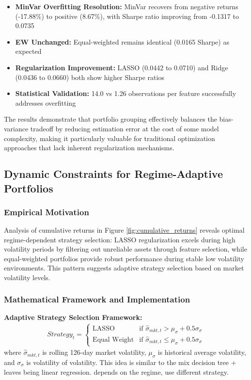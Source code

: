 \documentclass[12pt]{article}
\begin{document}
\begin{itemize}
    \item \textbf{MinVar Overfitting Resolution:} MinVar recovers from negative returns (-17.88\%) to positive (8.67\%), with Sharpe ratio improving from -0.1317 to 0.0735
    \item \textbf{EW Unchanged:} Equal-weighted remains identical (0.0165 Sharpe) as expected
    \item \textbf{Regularization Improvement:} LASSO (0.0442 to 0.0710) and Ridge (0.0436 to 0.0660) both show higher Sharpe ratios
    \item \textbf{Statistical Validation:} 14.0 vs 1.26 observations per feature successfully addresses overfitting
\end{itemize}

The results demonstrate that portfolio grouping effectively balances the bias-variance tradeoff by reducing estimation error at the cost of some model complexity, making it particularly valuable for traditional optimization approaches that lack inherent regularization mechanisms.

\subsection{Dynamic Constraints for Regime-Adaptive Portfolios}

\subsubsection{Empirical Motivation}
Analysis of cumulative returns in Figure \ref{fig:cumulative_returns} reveals optimal regime-dependent strategy selection: LASSO regularization excels during high volatility periods by filtering out unreliable assets through feature selection, while equal-weighted portfolios provide robust performance during stable low volatility environments. This pattern suggests adaptive strategy selection based on market volatility levels.

\subsubsection{Mathematical Framework and Implementation}
\textbf{Adaptive Strategy Selection Framework:}
\begin{align}
Strategy_t = \begin{cases}
\text{LASSO} & \text{if } \hat{\sigma}_{mkt,t} > \mu_{\sigma} + 0.5\sigma_{\sigma} \\
\text{Equal Weight} & \text{if } \hat{\sigma}_{mkt,t} \leq \mu_{\sigma} + 0.5\sigma_{\sigma}
\end{cases}
\end{align}
where $\hat{\sigma}_{mkt,t}$ is rolling 126-day market volatility, $\mu_{\sigma}$ is historical average volatility, and $\sigma_{\sigma}$ is volatility of volatility. This idea is similar to the mix decision tree + leaves being linear regression. depends on the regime, use different strategy.
\end{document}

